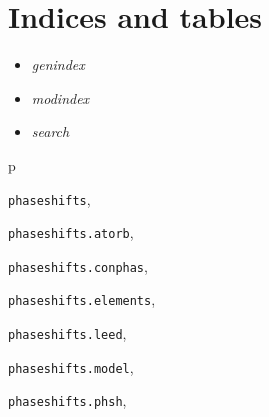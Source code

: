 \documentclass[letterpaper,10pt,english]{sphinxmanual}
\begin{document}
\chapter{Indices and tables}
\label{index:indices-and-tables}\begin{itemize}
\item {} 
\emph{genindex}

\item {} 
\emph{modindex}

\item {} 
\emph{search}

\end{itemize}


\renewcommand{\indexname}{Python Module Index}
\begin{theindex}
\def\bigletter#1{{\Large\sffamily#1}\nopagebreak\vspace{1mm}}
\bigletter{p}
\item {\texttt{phaseshifts}}, \pageref{modules:module-phaseshifts}
\item {\texttt{phaseshifts.atorb}}, \pageref{modules:module-phaseshifts.atorb}
\item {\texttt{phaseshifts.conphas}}, \pageref{modules:module-phaseshifts.conphas}
\item {\texttt{phaseshifts.elements}}, \pageref{modules:module-phaseshifts.elements}
\item {\texttt{phaseshifts.leed}}, \pageref{modules:module-phaseshifts.leed}
\item {\texttt{phaseshifts.model}}, \pageref{modules:module-phaseshifts.model}
\item {\texttt{phaseshifts.phsh}}, \pageref{modules:module-phaseshifts.phsh}
\end{theindex}

\renewcommand{\indexname}{Index}
\printindex
\end{document}

